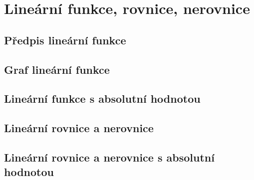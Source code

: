 
\newpage
    \section{Lineární funkce, rovnice, nerovnice}

        \subsection{Předpis lineární funkce}
        \subsection{Graf lineární funkce}
        \subsection{Lineární funkce s absolutní hodnotou}
        \subsection{Lineární rovnice a nerovnice}
        \subsection{Lineární rovnice a nerovnice s absolutní hodnotou}


